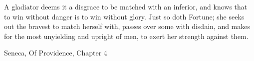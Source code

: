 
\epigraph{A gladiator deems it a disgrace to be matched with an inferior, and knows that to win without danger is to win without glory. Just so doth Fortune; she seeks out the bravest to match herself with, passes over some with disdain, and makes for the most unyielding and upright of men, to exert her strength against them. }{Seneca, Of Providence, Chapter 4}
